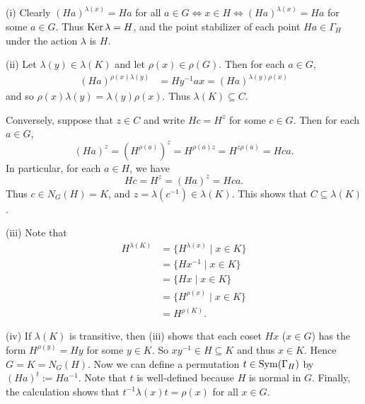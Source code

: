 \begin{sketch}
	(i) Clearly $(Ha)^{\lambda(x)} = Ha$ for all $a \in G \Leftrightarrow x \in H \Leftrightarrow (Ha)^{\lambda(x)} = Ha$ for some $a \in G$. Thus $\operatorname{Ker} \lambda = H$, and the point stabilizer of each point $Ha \in \Gamma_H$ under the action $\lambda$ is $H$.

(ii) Let $\lambda(y)\in \lambda(K)$ and let $\rho(x)\in \rho(G)$. Then for each $a \in G$,
	\begin{align*}
		(Ha)^{\rho(x)\lambda(y)} &= Hy^{-1}ax = (Ha)^{\lambda(y)\rho(x)}
	\end{align*}
	and so $\rho(x)\lambda(y) = \lambda(y)\rho(x)$. Thus $\lambda(K) \subseteq C$.

Conversely, suppose that $z \in C$ and write $Hc=H^z$ for some $c\in G$. Then for each $a \in G$,
\begin{equation*}
	(Ha)^z = (H^{\rho(a)})^z=H^{\rho(a)z} = H^{z\rho(a)} = Hca.
\end{equation*}
	In particular, for each $a \in H$, we have
\begin{equation*}
	Hc= H^z = (Ha)^z = Hca.
\end{equation*}  Thus $c \in N_G(H) = K$, and $z = \lambda(c^{-1}) \in \lambda(K)$. This shows that $C \subseteq \lambda(K)$.

(iii) Note that
\begin{align*}
	H^{\lambda(K)} &= \{H^{\lambda(x)}\mid x\in K\} 
	\\
	&= \{Hx^{-1}\mid x\in K\} 
	\\
	&= \{Hx\mid x\in K\}
	\\
	&= \{H^{\rho(x)}\mid x\in K\}
	\\
	&= H^{\rho(K)}.
\end{align*}

(iv) If $\lambda(K)$ is transitive, then (iii) shows that each coset $Hx$ ($x \in G$) has the form $H^{\rho(y)} = Hy$ for some $y \in K$. So $xy^{-1} \in H\subseteq K$ and thus $x\in K$. Hence $G = K = N_G(H)$. Now we can define a permutation $t \in\operatorname{Sym}(\Gamma_H)$ by $(Ha)^t := Ha^{-1}$. Note that $t$ is well-defined because $H$ is normal in $G$. Finally, the calculation shows that $t^{-1}\lambda(x)t = \rho(x)$ for all $x \in G$.
\end{sketch}

